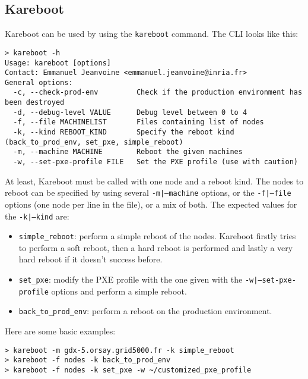 \documentclass[a4wide,10pt,oneside]{book}
\begin{document}
\subsection{Kareboot}
Kareboot can be used by using the \texttt{kareboot} command. The CLI looks like this:
\begin{small}
\begin{verbatim}
> kareboot -h
Usage: kareboot [options]
Contact: Emmanuel Jeanvoine <emmanuel.jeanvoine@inria.fr>
General options:
  -c, --check-prod-env         Check if the production environment has been destroyed
  -d, --debug-level VALUE      Debug level between 0 to 4
  -f, --file MACHINELIST       Files containing list of nodes
  -k, --kind REBOOT_KIND       Specify the reboot kind (back_to_prod_env, set_pxe, simple_reboot)
  -m, --machine MACHINE        Reboot the given machines
  -w, --set-pxe-profile FILE   Set the PXE profile (use with caution)
\end{verbatim}
\end{small}

At least, Kareboot must be called with one node and a reboot kind. The nodes to reboot can be specified by using several \texttt{-m|--machine} options, or the \texttt{-f|--file} options (one node per line in the file), or a mix of both. The expected values for the \texttt{-k|--kind} are:
\begin{itemize}
\item \texttt{simple\_reboot}: perform a simple reboot of the nodes. Kareboot firstly tries to perform a soft reboot, then a hard reboot is performed and lastly a very hard reboot if it doesn't success before.
\item \texttt{set\_pxe}: modify the PXE profile with the one given with the \texttt{-w|--set-pxe-profile} options and perform a simple reboot.
\item \texttt{back\_to\_prod\_env}: perform a reboot on the production environment.
\end{itemize}

Here are some basic examples:
\begin{verbatim}
> kareboot -m gdx-5.orsay.grid5000.fr -k simple_reboot
> kareboot -f nodes -k back_to_prod_env
> kareboot -f nodes -k set_pxe -w ~/customized_pxe_profile
\end{verbatim}
\end{document}
